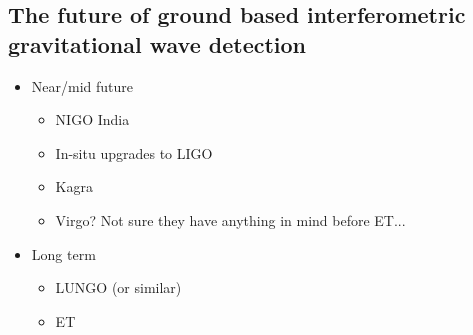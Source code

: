 \subsection{The future of ground based interferometric gravitational wave detection}\label{subsec:future}

\begin{itemize}
	\item Near/mid future
	\begin{itemize}
		\item NIGO India
		\item In-situ upgrades to LIGO
		\item Kagra
		\item Virgo? Not sure they have anything in mind before ET...
	\end{itemize}
	\item Long term
	\begin{itemize}
		\item LUNGO (or similar)
		\item ET
	\end{itemize}
\end{itemize}
